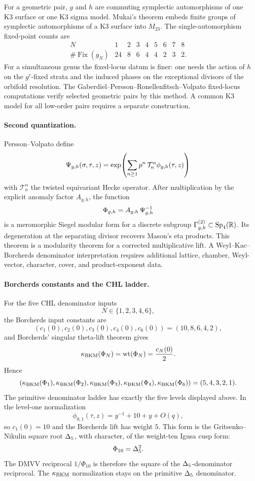 For a geometric pair, \(g\) and \(h\) are commuting symplectic
automorphisms of one K3 surface or one K3 sigma model.  Mukai's theorem
embeds finite groups of symplectic automorphisms of a K3 surface into
\(M_{23}\).  The single-automorphism fixed-point counts are
\[
\begin{array}{c|cccccccc}
N&1&2&3&4&5&6&7&8\\ \hline
\#\operatorname{Fix}(g_N)&24&8&6&4&4&2&3&2 .
\end{array}
\]
For a simultaneous genus the fixed-locus datum is finer: one needs the
action of \(h\) on the \(g^r\)-fixed strata and the induced phases on
the exceptional divisors of the orbifold resolution.  The
Gaberdiel--Persson--Ronellenfitsch--Volpato fixed-locus computations
verify selected geometric pairs by this method.  A common K3 model for
all low-order pairs requires a separate construction.

\paragraph{Second quantization.}
Persson--Volpato define
\[
  \Psi_{g,h}(\sigma,\tau,z)
  =\exp\!\left(\sum_{n\ge 1}p^n\,
  \mathcal T_n^\alpha\phi_{g,h}(\tau,z)\right)
\]
with \(\mathcal T_n^\alpha\) the twisted equivariant Hecke operator.
After multiplication by the explicit anomaly factor \(A_{g,h}\), the
function
\[
  \Phi_{g,h}=A_{g,h}\,\Psi_{g,h}^{-1}
\]
is a meromorphic Siegel modular form for a discrete subgroup
\(\Gamma^{(2)}_{g,h}\subset\mathrm{Sp}_4(\mathbb R)\).  Its degeneration at
the separating divisor recovers Mason's eta products.  This theorem is
a modularity theorem for a corrected multiplicative lift.  A
Weyl--Kac--Borcherds denominator interpretation requires additional
lattice, chamber, Weyl-vector, character, cover, and product-exponent
data.

\paragraph{Borcherds constants and the CHL ladder.}
For the five CHL denominator inputs
\[
  N\in\{1,2,3,4,6\},
\]
the Borcherds input constants are
\[
  (c_1(0),c_2(0),c_3(0),c_4(0),c_6(0))=(10,8,6,4,2),
\]
and Borcherds' singular theta-lift theorem gives
\[
  \kappa_{\mathrm{BKM}}(\Phi_N)=\operatorname{wt}(\Phi_N)=\frac{c_N(0)}2 .
\]
Hence
\[
  (\kappa_{\mathrm{BKM}}(\Phi_1),\kappa_{\mathrm{BKM}}(\Phi_2),\kappa_{\mathrm{BKM}}(\Phi_3),
  \kappa_{\mathrm{BKM}}(\Phi_4),\kappa_{\mathrm{BKM}}(\Phi_6))=(5,4,3,2,1).
\]
The primitive denominator ladder has exactly the five levels displayed
above.
In the level-one normalization
\[
  \phi_{0,1}(\tau,z)=y^{-1}+10+y+O(q),
\]
so \(c_1(0)=10\) and the Borcherds lift has weight \(5\).  This form is
the Gritsenko--Nikulin square root \(\Delta_5\), with character, of
the weight-ten Igusa cusp form:
\[
  \Phi_{10}=\Delta_5^2 .
\]
The DMVV reciprocal \(1/\Phi_{10}\) is therefore the square of the
\(\Delta_5\)-denominator reciprocal.  The \(\kappa_{\mathrm{BKM}}\) normalization
stays on the primitive \(\Delta_5\) denominator.

